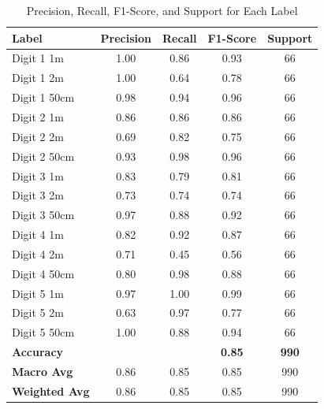 \documentclass[12pt,a4paper]{article}
\begin{document}
\begin{itemize}
\begin{table}[h!]
\centering
\begin{tabular}{|l|c|c|c|c|}
\hline
\textbf{Label}       & \textbf{Precision} & \textbf{Recall} & \textbf{F1-Score} & \textbf{Support} \\ \hline
Digit 1 1m           & 1.00               & 0.86            & 0.93              & 66               \\ \hline
Digit 1 2m           & 1.00               & 0.64            & 0.78              & 66               \\ \hline
Digit 1 50cm         & 0.98               & 0.94            & 0.96              & 66               \\ \hline
Digit 2 1m           & 0.86               & 0.86            & 0.86              & 66               \\ \hline
Digit 2 2m           & 0.69               & 0.82            & 0.75              & 66               \\ \hline
Digit 2 50cm         & 0.93               & 0.98            & 0.96              & 66               \\ \hline
Digit 3 1m           & 0.83               & 0.79            & 0.81              & 66               \\ \hline
Digit 3 2m           & 0.73               & 0.74            & 0.74              & 66               \\ \hline
Digit 3 50cm         & 0.97               & 0.88            & 0.92              & 66               \\ \hline
Digit 4 1m           & 0.82               & 0.92            & 0.87              & 66               \\ \hline
Digit 4 2m           & 0.71               & 0.45            & 0.56              & 66               \\ \hline
Digit 4 50cm         & 0.80               & 0.98            & 0.88              & 66               \\ \hline
Digit 5 1m           & 0.97               & 1.00            & 0.99              & 66               \\ \hline
Digit 5 2m           & 0.63               & 0.97            & 0.77              & 66               \\ \hline
Digit 5 50cm         & 1.00               & 0.88            & 0.94              & 66               \\ \hline
\textbf{Accuracy}    &                    &                 & \textbf{0.85}     & \textbf{990}     \\ \hline
\textbf{Macro Avg}   & 0.86               & 0.85            & 0.85              & 990              \\ \hline
\textbf{Weighted Avg} & 0.86              & 0.85            & 0.85              & 990              \\ \hline
\end{tabular}
\caption{Precision, Recall, F1-Score, and Support for Each Label}
\label{tab:classification_metrics}
\end{table}


\end{itemize}
\end{document}
